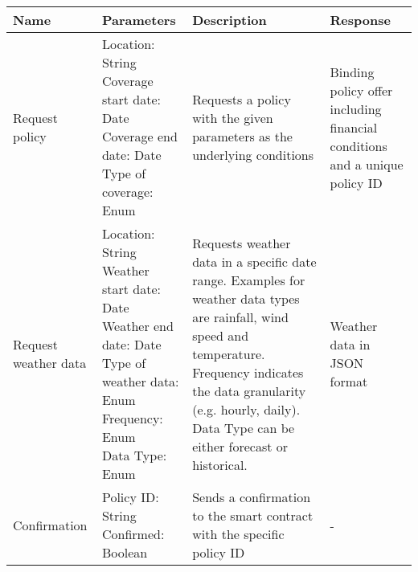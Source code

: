 \renewcommand{\arraystretch}{1.3}
\begin{tabular}{|>{\centering\arraybackslash}m{2cm}|>{\centering\arraybackslash}p{5cm}|>{\centering\arraybackslash}m{5cm}|>{\centering\arraybackslash}m{3cm}|}
    \hline
    \textbf{Name} & \textbf{Parameters} & \textbf{Description} & \textbf{Response} \\ 
    \hline
    Request policy & \makecell{Location: String \\ Coverage start date: Date \\ Coverage end date: Date \\ Type of coverage: Enum}  & Requests a policy with the given parameters as the underlying conditions & Binding policy offer including financial conditions and a unique policy ID\\ 
    \hline
    Request weather data & \makecell{Location: String \\ Weather start date: Date \\ Weather end date: Date \\ Type of weather data: Enum \\ Frequency: Enum \\ Data Type: Enum} & Requests weather data in a specific date range. Examples for weather data types are rainfall, wind speed and temperature. Frequency indicates the data granularity (e.g. hourly, daily). Data Type can be either forecast or historical. &  Weather data in JSON format \\ 
    \hline
    Confirmation & \makecell{Policy ID: String \\ Confirmed: Boolean} & Sends a confirmation to the smart contract with the specific policy ID & - \\ 
    \hline
\end{tabular}